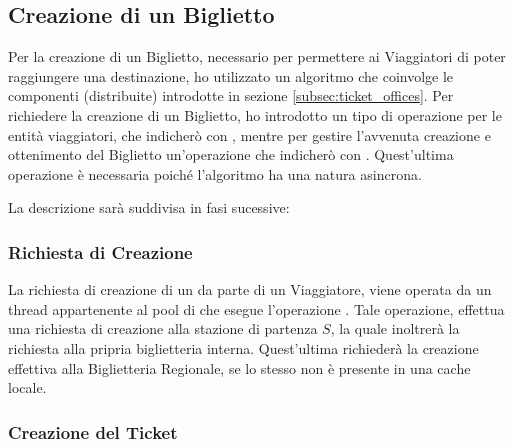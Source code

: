 \subsection{Creazione di un Biglietto}

Per la creazione di un Biglietto, necessario per permettere ai Viaggiatori di poter raggiungere una destinazione, ho utilizzato un algoritmo che coinvolge le componenti (distribuite) introdotte in sezione \ref{subsec:ticket_offices}. Per richiedere la creazione di un Biglietto, ho introdotto un tipo di operazione per le entità viaggiatori, che indicherò con , mentre per gestire l'avvenuta creazione e ottenimento del Biglietto un'operazione che indicherò con . Quest'ultima operazione è necessaria poiché l'algoritmo ha una natura asincrona.

La descrizione sarà suddivisa in fasi sucessive:

	\subsubsection {Richiesta di Creazione}
	
	La richiesta di creazione di un  da parte di un Viaggiatore, viene operata da un thread appartenente al pool di  che esegue l'operazione . Tale operazione, effettua una richiesta di creazione alla stazione di partenza $S$, la quale inoltrerà la richiesta alla pripria biglietteria interna. Quest'ultima richiederà la creazione effettiva alla Biglietteria Regionale, se lo stesso  non è presente in una cache locale.  
	
	\subsubsection {Creazione del Ticket}
	

